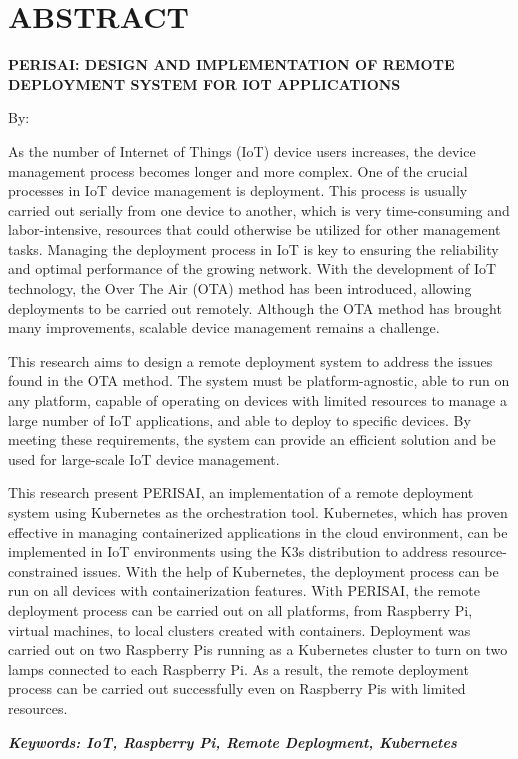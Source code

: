 \clearpage
\chapter*{ABSTRACT}

\begin{center}
  \center
  \begin{singlespace}
    \large\bfseries\MakeUppercase{PERISAI: DESIGN AND IMPLEMENTATION OF REMOTE DEPLOYMENT SYSTEM FOR IOT APPLICATIONS}
    
    \normalfont\normalsize
    By:
    
    \bfseries \theauthor
  \end{singlespace}
\end{center}


\begin{singlespace}
  \small
  As the number of Internet of Things (IoT) device users increases, the device management process becomes longer and more complex. One of the crucial processes in IoT device management is deployment. This process is usually carried out serially from one device to another, which is very time-consuming and labor-intensive, resources that could otherwise be utilized for other management tasks. Managing the deployment process in IoT is key to ensuring the reliability and optimal performance of the growing network. With the development of IoT technology, the Over The Air (OTA) method has been introduced, allowing deployments to be carried out remotely. Although the OTA method has brought many improvements, scalable device management remains a challenge.
  
  This research aims to design a remote deployment system to address the issues found in the OTA method. The system must be platform-agnostic, able to run on any platform, capable of operating on devices with limited resources to manage a large number of IoT applications, and able to deploy to specific devices. By meeting these requirements, the system can provide an efficient solution and be used for large-scale IoT device management.
  
  This research present PERISAI, an implementation of a remote deployment system using Kubernetes as the orchestration tool. Kubernetes, which has proven effective in managing containerized applications in the cloud environment, can be implemented in IoT environments using the K3s distribution to address resource-constrained issues. With the help of Kubernetes, the deployment process can be run on all devices with containerization features. With PERISAI, the remote deployment process can be carried out on all platforms, from Raspberry Pi, virtual machines, to local clusters created with containers. Deployment was carried out on two Raspberry Pis running as a Kubernetes cluster to turn on two lamps connected to each Raspberry Pi. As a result, the remote deployment process can be carried out successfully even on Raspberry Pis with limited resources.
  
  \textbf{\textit{Keywords: IoT, Raspberry Pi, Remote Deployment, Kubernetes }}
\end{singlespace}
\clearpage

\clearpage